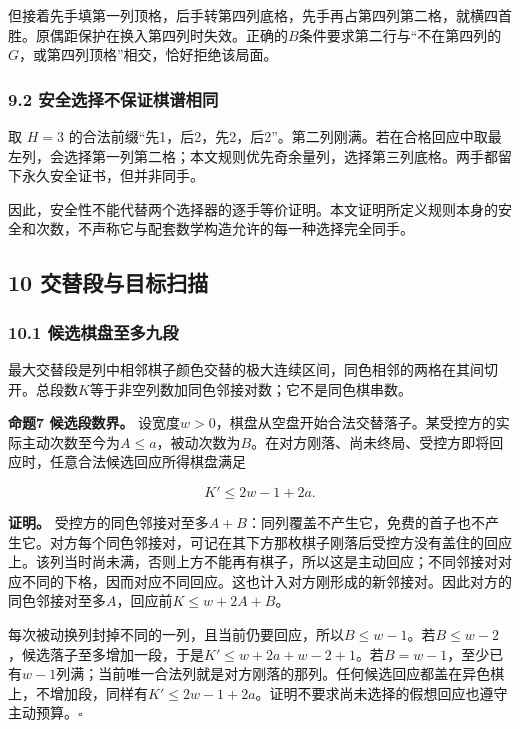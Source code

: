 \documentclass[
  a4paper,
]{article}
\begin{document}
但接着先手填第一列顶格，后手转第四列底格，先手再占第四列第二格，就横四首胜。原偶距保护在换入第四列时失效。正确的\(B\)条件要求第二行与``不在第四列的\(G\)，或第四列顶格''相交，恰好拒绝该局面。

\subsubsection{9.2
安全选择不保证棋谱相同}\label{ux5b89ux5168ux9009ux62e9ux4e0dux4fddux8bc1ux68cbux8c31ux76f8ux540c}

取 \(H=3\)
的合法前缀``先1，后2，先2，后2''。第二列刚满。若在合格回应中取最左列，会选择第一列第二格；本文规则优先奇余量列，选择第三列底格。两手都留下永久安全证书，但并非同手。

因此，安全性不能代替两个选择器的逐手等价证明。本文证明所定义规则本身的安全和次数，不声称它与配套数学构造允许的每一种选择完全同手。

\subsection{10
交替段与目标扫描}\label{ux4ea4ux66ffux6bb5ux4e0eux76eeux6807ux626bux63cf}

\subsubsection{10.1
候选棋盘至多九段}\label{ux5019ux9009ux68cbux76d8ux81f3ux591aux4e5dux6bb5}

最大交替段是列中相邻棋子颜色交替的极大连续区间，同色相邻的两格在其间切开。总段数\(K\)等于非空列数加同色邻接对数；它不是同色棋串数。

\textbf{命题7 候选段数界。}
设宽度\(w>0\)，棋盘从空盘开始合法交替落子。某受控方的实际主动次数至今为\(A\le a\)，被动次数为\(B\)。在对方刚落、尚未终局、受控方即将回应时，任意合法候选回应所得棋盘满足

\[K'\le 2w-1+2a.\]

\textbf{证明。}
受控方的同色邻接对至多\(A+B\)：同列覆盖不产生它，免费的首子也不产生它。对方每个同色邻接对，可记在其下方那枚棋子刚落后受控方没有盖住的回应上。该列当时尚未满，否则上方不能再有棋子，所以这是主动回应；不同邻接对对应不同的下格，因而对应不同回应。这也计入对方刚形成的新邻接对。因此对方的同色邻接对至多\(A\)，回应前\(K\le w+2A+B\)。

每次被动换列封掉不同的一列，且当前仍要回应，所以\(B\le w-1\)。若\(B\le w-2\)，候选落子至多增加一段，于是\(K'\le w+2a+w-2+1\)。若\(B=w-1\)，至少已有\(w-1\)列满；当前唯一合法列就是对方刚落的那列。任何候选回应都盖在异色棋上，不增加段，同样有\(K'\le2w-1+2a\)。证明不要求尚未选择的假想回应也遵守主动预算。\(\square\)
\end{document}
